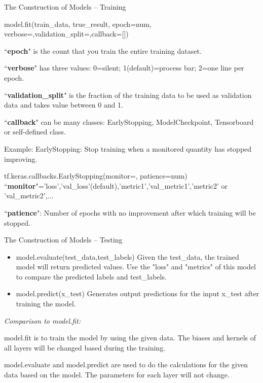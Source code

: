 \documentclass{beamer}
\begin{document}
\begin{frame}{The Construction of Models -- Training}

\begin{flushleft}

\footnotesize{\color{blue} model.fit(train\_data, true\_result, epoch=num, verbose=,validation\_split=,callback=[])}

``\textbf{epoch}" is the count that you train the entire training dataset.

``\textbf{verbose}" has three values: 0=silent; 1(default)=process bar; 2=one line per epoch.

``\textbf{validation\_split}" is the fraction of the training data to be used as validation data and takes value between 0 and 1.

``\textbf{callback}" can be many classes: EarlyStopping, ModelCheckpoint, Tensorboard or self-defined class.
\bigskip

{\color{blue} Example: }
EarlyStopping: Stop training when a monitored quantity has stopped improving.

{\color{blue} tf.keras.callbacks.EarlyStopping(monitor=, patience=num)}
``\textbf{monitor}"='loss','val\_loss'(default),'metric1','val\_metric1','metric2' or 'val\_metric2',...

``\textbf{patience}": Number of epochs with no improvement after which training will be stopped.

\end{flushleft}

\end{frame}

\begin{frame}{The Construction of Models -- Testing}
\begin{itemize}
  \item {\color{blue} model.evaluate(test\_data,test\_labels)}
  Given the test\_data, the trained model will return predicted values. Use the "loss" and "metrics" of this model to compare the predicted labels and test\_labels.
  \item {\color{blue} model.predict(x\_test)}
  Generates output predictions for the input x\_test after training the model.
\end{itemize}
\begin{flushleft}
\emph{Comparison to model.fit:}

model.fit is to train the model by using the given data. The biases and kernels of all layers will be changed based during the training.
\bigskip

model.evaluate and model.predict are used to do the calculations for the given data based on the model. The parameters for each layer will not change.
\end{flushleft}
\end{frame}
\end{document}
